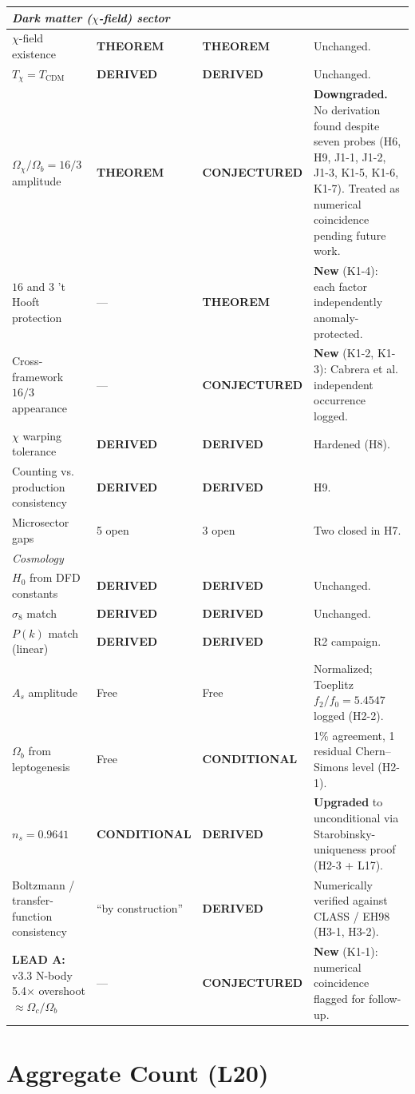 \documentclass[11pt]{article}
\newcommand{\THM}{\textcolor{thmcol}{\textbf{THEOREM}}}
\newcommand{\DER}{\textcolor{dercol}{\textbf{DERIVED}}}
\newcommand{\CON}{\textcolor{condcol}{\textbf{CONDITIONAL}}}
\newcommand{\CNJ}{\textcolor{conjcol}{\textbf{CONJECTURED}}}
\begin{document}
\begin{longtable}{p{} p{} p{} p{}}
\multicolumn{4}{l}{\textit{Dark matter ($\chi$-field) sector}} \\
\midrule
$\chi$-field existence & \THM & \THM & Unchanged. \\
$T_\chi = T_\text{CDM}$ & \DER & \DER & Unchanged. \\
$\Omega_\chi / \Omega_b = 16/3$ amplitude & \THM & \CNJ & \textbf{Downgraded.} No derivation found despite seven probes (H6, H9, J1-1, J1-2, J1-3, K1-5, K1-6, K1-7). Treated as numerical coincidence pending future work. \\
$16$ and $3$ 't Hooft protection & --- & \THM & \textbf{New} (K1-4): each factor independently anomaly-protected. \\
Cross-framework $16/3$ appearance & --- & \CNJ & \textbf{New} (K1-2, K1-3): Cabrera et al. independent occurrence logged. \\
$\chi$ warping tolerance & \DER & \DER & Hardened (H8). \\
Counting vs. production consistency & \DER & \DER & H9. \\
Microsector gaps & 5 open & 3 open & Two closed in H7. \\
\midrule

\multicolumn{4}{l}{\textit{Cosmology}} \\
\midrule
$H_0$ from DFD constants & \DER & \DER & Unchanged. \\
$\sigma_8$ match & \DER & \DER & Unchanged. \\
$P(k)$ match (linear) & \DER & \DER & R2 campaign. \\
$A_s$ amplitude & Free & Free & Normalized; Toeplitz $f_2/f_0 = 5.4547$ logged (H2-2). \\
$\Omega_b$ from leptogenesis & Free & \CON & 1\% agreement, 1 residual Chern--Simons level (H2-1). \\
$n_s = 0.9641$ & \CON & \DER & \textbf{Upgraded} to unconditional via Starobinsky-uniqueness proof (H2-3 + L17). \\
Boltzmann / transfer-function consistency & ``by construction'' & \DER & Numerically verified against CLASS / EH98 (H3-1, H3-2). \\
\textbf{LEAD A:} v3.3 N-body 5.4$\times$ overshoot $\approx \Omega_c/\Omega_b$ & --- & \CNJ & \textbf{New} (K1-1): numerical coincidence flagged for follow-up. \\
\bottomrule
\end{longtable}

\section*{Aggregate Count (L20)}
\end{document}
